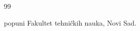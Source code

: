 \documentclass[12pt,a4paper]{report}
\begin{document}
\maketitlepage

\tableofcontents
\newpage

\listoffigures
\newpage






\newpage
\begin{thebibliography}{99}

popuni
Fakultet tehničkih nauka, Novi Sad.

\end{thebibliography}
\end{document}
